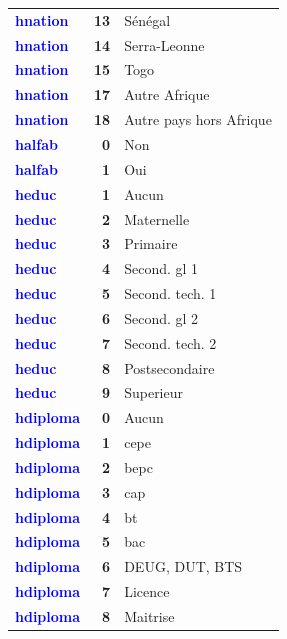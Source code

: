\documentclass[
]{article}
\begin{document}
\begin{longtable}[t]{>{}l>{}r>{\raggedright\arraybackslash}p{8cm}}
\textcolor{blue}{\textbf{hnation}} & \textbf{13} & Sénégal\\
\textcolor{blue}{\textbf{hnation}} & \textbf{14} & Serra-Leonne\\
\addlinespace
\textcolor{blue}{\textbf{hnation}} & \textbf{15} & Togo\\
\textcolor{blue}{\textbf{hnation}} & \textbf{17} & Autre Afrique\\
\textcolor{blue}{\textbf{hnation}} & \textbf{18} & Autre pays hors Afrique\\
\textcolor{blue}{\textbf{halfab}} & \textbf{0} & Non\\
\textcolor{blue}{\textbf{halfab}} & \textbf{1} & Oui\\
\addlinespace
\textcolor{blue}{\textbf{heduc}} & \textbf{1} & Aucun\\
\textcolor{blue}{\textbf{heduc}} & \textbf{2} & Maternelle\\
\textcolor{blue}{\textbf{heduc}} & \textbf{3} & Primaire\\
\textcolor{blue}{\textbf{heduc}} & \textbf{4} & Second. gl 1\\
\textcolor{blue}{\textbf{heduc}} & \textbf{5} & Second. tech. 1\\
\addlinespace
\textcolor{blue}{\textbf{heduc}} & \textbf{6} & Second. gl 2\\
\textcolor{blue}{\textbf{heduc}} & \textbf{7} & Second. tech. 2\\
\textcolor{blue}{\textbf{heduc}} & \textbf{8} & Postsecondaire\\
\textcolor{blue}{\textbf{heduc}} & \textbf{9} & Superieur\\
\textcolor{blue}{\textbf{hdiploma}} & \textbf{0} & Aucun\\
\addlinespace
\textcolor{blue}{\textbf{hdiploma}} & \textbf{1} & cepe\\
\textcolor{blue}{\textbf{hdiploma}} & \textbf{2} & bepc\\
\textcolor{blue}{\textbf{hdiploma}} & \textbf{3} & cap\\
\textcolor{blue}{\textbf{hdiploma}} & \textbf{4} & bt\\
\textcolor{blue}{\textbf{hdiploma}} & \textbf{5} & bac\\
\addlinespace
\textcolor{blue}{\textbf{hdiploma}} & \textbf{6} & DEUG, DUT, BTS\\
\textcolor{blue}{\textbf{hdiploma}} & \textbf{7} & Licence\\
\textcolor{blue}{\textbf{hdiploma}} & \textbf{8} & Maitrise\\

\end{longtable}
\end{document}
